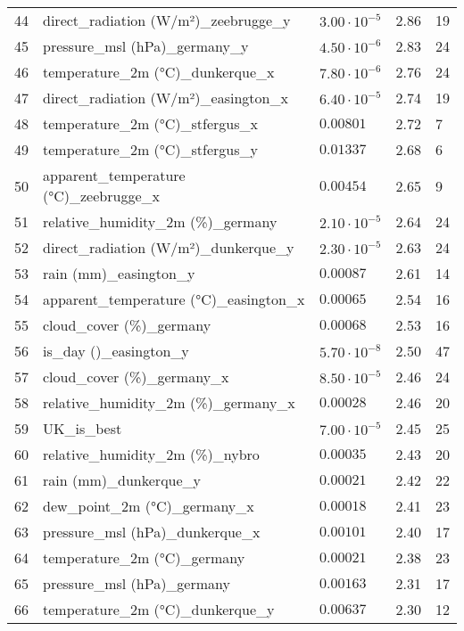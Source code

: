 \begin{table}[H]
\begin{tabular}{r l l l l}
        44 & direct\_radiation (W/m²)\_zeebrugge\_y & $3.00 \cdot 10^{-5}$ & 2.86 & 19 \\
        45 & pressure\_msl (hPa)\_germany\_y & $4.50 \cdot 10^{-6}$ & 2.83 & 24 \\
        46 & temperature\_2m (°C)\_dunkerque\_x & $7.80 \cdot 10^{-6}$ & 2.76 & 24 \\
        47 & direct\_radiation (W/m²)\_easington\_x & $6.40 \cdot 10^{-5}$ & 2.74 & 19 \\
        48 & temperature\_2m (°C)\_stfergus\_x & $0.00801$ & 2.72 & 7 \\
        49 & temperature\_2m (°C)\_stfergus\_y & $0.01337$ & 2.68 & 6 \\
        50 & apparent\_temperature (°C)\_zeebrugge\_x & $0.00454$ & 2.65 & 9 \\
        51 & relative\_humidity\_2m (\%)\_germany & $2.10 \cdot 10^{-5}$ & 2.64 & 24 \\
        52 & direct\_radiation (W/m²)\_dunkerque\_y & $2.30 \cdot 10^{-5}$ & 2.63 & 24 \\
        53 & rain (mm)\_easington\_y & $0.00087$ & 2.61 & 14 \\
        54 & apparent\_temperature (°C)\_easington\_x & $0.00065$ & 2.54 & 16 \\
        55 & cloud\_cover (\%)\_germany & $0.00068$ & 2.53 & 16 \\
        56 & is\_day ()\_easington\_y & $5.70 \cdot 10^{-8}$ & 2.50 & 47 \\
        57 & cloud\_cover (\%)\_germany\_x & $8.50 \cdot 10^{-5}$ & 2.46 & 24 \\
        58 & relative\_humidity\_2m (\%)\_germany\_x & $0.00028$ & 2.46 & 20 \\
        59 & UK\_is\_best & $7.00 \cdot 10^{-5}$ & 2.45 & 25 \\
        60 & relative\_humidity\_2m (\%)\_nybro & $0.00035$ & 2.43 & 20 \\
        61 & rain (mm)\_dunkerque\_y & $0.00021$ & 2.42 & 22 \\
        62 & dew\_point\_2m (°C)\_germany\_x & $0.00018$ & 2.41 & 23 \\
        63 & pressure\_msl (hPa)\_dunkerque\_x & $0.00101$ & 2.40 & 17 \\
        64 & temperature\_2m (°C)\_germany & $0.00021$ & 2.38 & 23 \\
        65 & pressure\_msl (hPa)\_germany & $0.00163$ & 2.31 & 17 \\
        66 & temperature\_2m (°C)\_dunkerque\_y & $0.00637$ & 2.30 & 12 \\

\end{tabular}
\end{table}
